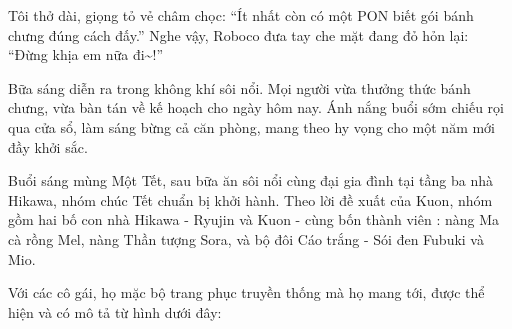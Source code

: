\documentclass[../main.tex]{subfiles}
\begin{document}
Tôi thở dài, giọng tỏ vẻ châm chọc: ``Ít nhất còn có một PON biết gói bánh chưng đúng cách đấy.'' Nghe vậy, Roboco đưa tay che mặt đang đỏ hỏn lại: ``Đừng khịa em nữa đi\~{}!''

Bữa sáng diễn ra trong không khí sôi nổi. Mọi người vừa thưởng thức bánh chưng, vừa bàn tán về kế hoạch cho ngày hôm nay. Ánh nắng buổi sớm chiếu rọi qua cửa sổ, làm sáng bừng cả căn phòng, mang theo hy vọng cho một năm mới đầy khởi sắc.

\ct

\pov{-}

Buổi sáng mùng Một Tết, sau bữa ăn sôi nổi cùng đại gia đình tại tầng ba nhà Hikawa, nhóm chúc Tết chuẩn bị khởi hành. Theo lời đề xuất của Kuon, nhóm gồm hai bố con nhà Hikawa - Ryujin và Kuon - cùng bốn thành viên \hll : nàng Ma cà rồng Mel, nàng Thần tượng Sora, và bộ đôi Cáo trắng - Sói đen Fubuki và Mio.

Với các cô gái, họ mặc bộ trang phục truyền thống mà họ mang tới, được thể hiện và có mô tả từ hình dưới đây:
\end{document}
